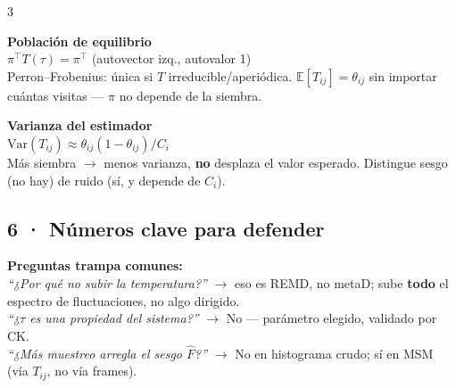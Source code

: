 \documentclass[9pt]{extarticle}
\newcommand{\F}[2]{%
  \par\noindent\textbf{\color{miazul}#1}\\[-0.15em]
  #2\\[0.35em]
}
\begin{document}
\begin{multicols}{3}
\F{Población de equilibrio}{
$\pi^\top T(\tau)=\pi^\top$ (autovector izq., autovalor 1)\\
{\scriptsize Perron--Frobenius: única si $T$ irreducible/aperiódica. $\mathbb E[T_{ij}]=\theta_{ij}$ sin importar cuántas visitas — $\pi$ no depende de la siembra.}}

\F{Varianza del estimador}{
$\mathrm{Var}(T_{ij})\approx\theta_{ij}(1-\theta_{ij})/C_i$\\
{\scriptsize Más siembra $\to$ menos varianza, \textbf{no} desplaza el valor esperado. Distingue sesgo (no hay) de ruido (sí, y depende de $C_i$).}}

\subsection*{\small 6 · Números clave para defender}


\vspace{0.4em}
{\scriptsize\color{migris}\textbf{Preguntas trampa comunes:}\\
\emph{``¿Por qué no subir la temperatura?''} $\to$ eso es REMD, no metaD; sube \textbf{todo} el espectro de fluctuaciones, no algo dirigido.\\
\emph{``¿$\tau$ es una propiedad del sistema?''} $\to$ No — parámetro elegido, validado por CK.\\
\emph{``¿Más muestreo arregla el sesgo $\hat F$?''} $\to$ No en histograma crudo; sí en MSM (vía $T_{ij}$, no vía frames).}

\end{multicols}
\end{document}
